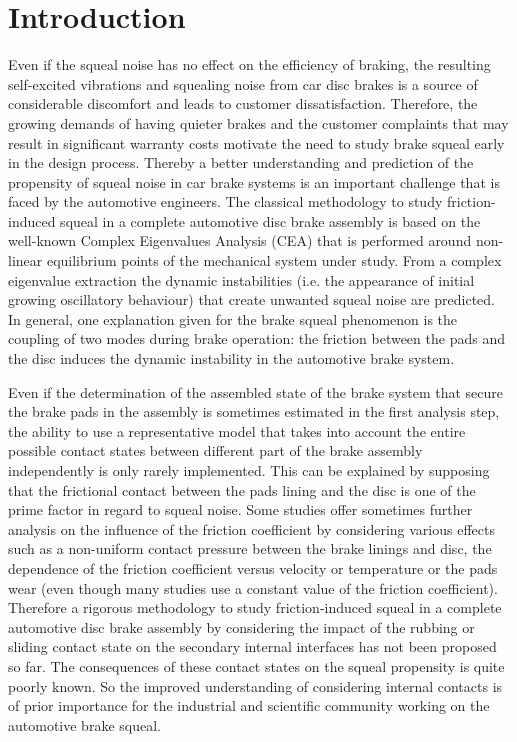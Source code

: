 \documentclass[final,1p]{elsarticle}
\begin{document}
\section{Introduction}
\label{sec:intro}

Even if the squeal noise has no effect on the efficiency of braking, the resulting self-excited vibrations and squealing noise from car disc brakes is a source of considerable discomfort and leads to customer dissatisfaction. Therefore,  the growing demands of having quieter brakes and the customer complaints that may result in significant warranty costs motivate the need to study brake squeal early in the design process. Thereby a better understanding and prediction of the propensity of squeal noise in car brake systems  is an important challenge that is faced by the automotive engineers. The classical methodology to study friction-induced squeal in a complete automotive disc brake assembly is based on the well-known Complex Eigenvalues Analysis (CEA) that is performed around non-linear equilibrium points of the mechanical system under study. From a complex eigenvalue extraction the dynamic instabilities (i.e. the appearance of initial growing oscillatory behaviour) that create unwanted squeal noise are predicted. In general, one explanation given for the brake squeal phenomenon is the coupling of two modes during brake operation: the friction between the pads and the disc induces the dynamic instability in the automotive brake system.

Even if the determination of  the assembled state of the brake system that secure the brake pads in the assembly is sometimes estimated in the first analysis step, the ability to use a representative model that takes into account the entire possible contact states  between different part of the brake assembly independently is only rarely implemented. This can be explained by supposing that the frictional contact between the pads lining and the disc is  one of the prime  factor in regard to squeal noise. Some studies offer sometimes further analysis on the influence of the friction coefficient by considering various effects such as a non-uniform contact pressure between the brake linings and disc, the dependence of the friction coefficient versus velocity or temperature or the pads wear (even though many studies use a constant value of the friction coefficient). Therefore a rigorous methodology to study friction-induced squeal in a complete automotive disc brake assembly by considering the impact of the rubbing or sliding contact state on the secondary internal interfaces has not been proposed so far. The consequences of these contact states on the squeal propensity is quite poorly known. So the improved understanding of considering internal contacts is of prior importance for the industrial and scientific community working on the automotive brake squeal.
\end{document}
